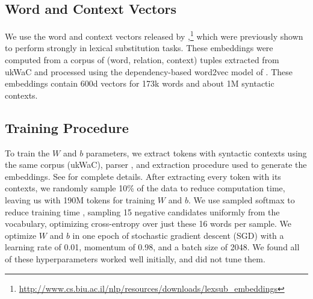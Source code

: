 \subsection{Word and Context Vectors}

We use the word and context vectors released by
,\footnote{\url{http://www.cs.biu.ac.il/nlp/resources/downloads/lexsub_embeddings}}
which were previously shown to perform strongly in lexical substitution
tasks. These embeddings were computed from a corpus of
(word, relation, context) tuples extracted from ukWaC and processed using the
dependency-based word2vec model of . These embeddings
contain 600d vectors for 173k words and about 1M syntactic contexts.


\subsection{Training Procedure}
\label{sec:training}

To train the $W$ and $b$ parameters, we extract tokens with syntactic contexts
using the same corpus (ukWaC), parser \cite{chen:2014:emnlp}, and extraction procedure
used to generate the embeddings. See \cite{melamud:2015:vsm} for complete details.
After extracting every token with its contexts, we randomly sample 10\% of the
data to reduce computation time, leaving us with 190M tokens for training $W$ and $b$.
We use sampled softmax to reduce training time \cite{jean:2015:acl},
sampling 15 negative candidates uniformly from the vocabulary, optimizing
cross-entropy over just these 16 words per sample.
We optimize $W$ and $b$ in one epoch of stochastic gradient descent (SGD) with
a learning rate of 0.01, momentum of 0.98, and a batch size of 2048. We found
all of these hyperparameters worked well initially, and did not tune them.


